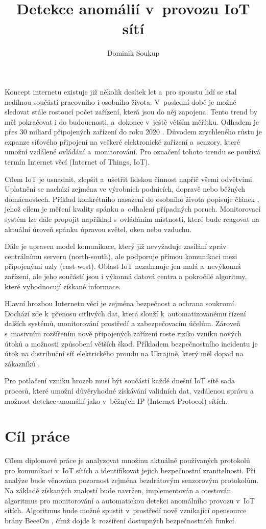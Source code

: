 \documentclass[thesis=M,czech]{FITthesis}[2012/06/26]
\title{Detekce anomálií v~provozu IoT sítí}
\author{Dominik Soukup}
\begin{document}
\begin{introduction}
Koncept internetu existuje již několik desítek let a~pro spoustu lidí se stal 
nedílnou součástí pracovního i osobního života. V~poslední době je možné sledovat
stále rostoucí počet zařízení, která jsou do něj zapojena. Tento trend by měl
pokračovat i do budoucnosti, a~dokonce v~ještě větším měřítku. Odhadem je 
přes 30 miliard připojených zařízení do roku 2020 \cite{iotDevices}.
Důvodem zrychleného
růstu je expanze síťového připojení na veškeré elektronické zařízení a~senzory, 
které umožní vzdálené ovládání a~monitorování. Pro označení tohoto trendu se používá
termín Internet věcí (Internet of Things, IoT).

Cílem IoT je usnadnit, zlepšit a~ušetřit lidskou činnost napříč všemi odvětvími. 
Uplatnění se nachází zejména ve výrobních podnicích, dopravě nebo běžných domácnostech.
Příklad konkrétního nasazení do osobního života popisuje článek \cite{sleeping}, jehož cílem je měření 
kvality spánku a~odhalení případných poruch. Monitorovací systém lze dále 
propojit například s~ovládáním místnosti, které bude reagovat na aktuální úroveň spánku
úpravou světel, oken nebo vzduchu.

Dále je upraven model komunikace, který již nevyžaduje zasílání zpráv centrálnímu 
serveru (north-south), ale podporuje přímou komunikaci mezi připojenými uzly (east-west).
Oblast IoT nezahrnuje jen malá a~nevýkonná zařízení, ale jeho součástí jsou i 
výkonná datová centra a pokročilé algoritmy, které vyhodnocují získané informace.

Hlavní hrozbou Internetu věcí je zejména bezpečnost a ochrana soukromí. Dochází zde k~přenosu
citlivých dat, která slouží
k~automatizovanému řízení dalších
systémů, monitorování prostředí a zabezpečovacím účelům. Zároveň s~masivním rozšířením nově
připojených zařízení roste riziko vzniku nových útoků a možnosti způsobení větších
škod. Příkladem bezpečnostního incidentu je útok na distribuční síť elektrického 
proudu na Ukrajině, který měl dopad na  zákazníků \cite{ukraine}. 

Pro potlačení vzniku hrozeb musí být součástí každé dnešní IoT sítě sada procesů,
které umožní důvěryhodné
získávání validních dat, vzdálenou správu a možnost
detekce anomálií jako v~běžných IP (Internet Protocol) sítích.

\section{Cíl práce}
Cílem diplomové práce je analyzovat množinu aktuálně používaných protokolů
pro komunikaci v~IoT sítích a identifikovat jejich bezpečnostní zranitelnosti.
Při analýze bude věnována pozornost zejména bezdrátovým senzorovým protokolům.
Na základě získaných znalostí bude navržen, implementován a otestován algoritmus
pro monitorování a automatickou detekci anomálního provozu v~IoT sítích.
Algoritmus bude možné spustit
v~prostředí nově vznikající opensource brány BeeeOn \cite{beeeon}, čímž dojde k~rozšíření 
dostupných bezpečnostních funkcí.
\end{introduction}
\end{document}
